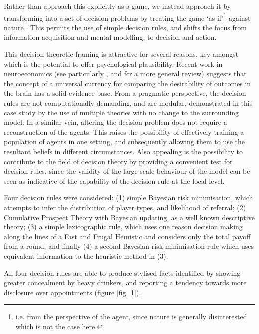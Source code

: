 \documentclass[twocolumn]{article}
\begin{document}
Rather than approach this explicitly as a game, we instead approach it by transforming into a set of decision problems by treating the game `as if'\footnote{i.e. from the perspective of the agent, since nature is generally disinterested which is not the case here.} against nature \citep{RiosInsua2009}. This permits the use of simple decision rules, and shifts the focus from information acquisition and mental modelling, to decision and action. 

This decision theoretic framing is attractive for several reasons, key amongst which is the potential to offer psychological plausibility. Recent work in neuroeconomics (see particularly \citep{Padoa-Schioppa2006}, and \citep{Rustichini2009} for a more general review) suggests that the concept of a universal currency for comparing the desirability of outcomes in the brain has a solid evidence base.  
From a pragmatic perspective, the decision rules are not computationally demanding, and are modular, demonstrated in this case study by the use of multiple theories with no change to the surrounding model.  In a similar vein, altering the decision problem does not require a reconstruction of the agents. This raises the possibility of effectively training a population of agents in one setting, and subsequently allowing them to use the resultant beliefs in different circumstances. Also appealing is the possibility to contribute to the field of decision theory by providing a convenient test for decision rules, since the validity of the large scale behaviour of the model can be seen as indicative of the capability of the decision rule at the local level.

Four decision rules were considered: (1) simple Bayesian risk minimisation, which attempts to infer the distribution of player types, and likelihood of referral; (2) Cumulative Prospect Theory \citep{Tversky1992} with Bayesian updating, as a well known descriptive theory; (3) a simple lexicographic rule, which uses one reason decision making along the lines of a Fast and Frugal Heuristic \citep{Gigerenzer1996} and considers only the total payoff from a round; and finally (4) a second Bayesian risk minimisation rule which uses equivalent information to the heuristic method in (3).

All four decision rules are able to produce stylised facts identified by \citep{Alvik2006} showing greater concealment by heavy drinkers, and \citep{Phillips2007} reporting a tendency towards more disclosure over appointments (figure \ref{fig_1}). 
\end{document}
